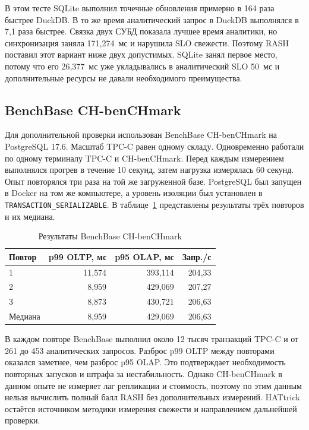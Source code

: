 \documentclass{misisarticle}
\begin{document}
	\newpage
	В этом тесте SQLite выполнил точечные обновления примерно в 164 раза быстрее DuckDB. В то же время аналитический запрос в DuckDB выполнялся в 7{,}1 раза быстрее. Связка двух СУБД показала лучшее время аналитики, но синхронизация заняла 171{,}274~мс и нарушила SLO свежести. Поэтому RASH поставил этот вариант ниже двух допустимых. SQLite занял первое место, потому что его 26{,}377~мс уже укладывались в аналитический SLO 50~мс и дополнительные ресурсы не давали необходимого преимущества.

\subsection{\textnormal{BenchBase CH-benCHmark}}

	Для дополнительной проверки использован BenchBase CH-benCHmark на PostgreSQL 17.6. Масштаб TPC-C равен одному складу. Одновременно работали по одному терминалу TPC-C и CH-benCHmark. Перед каждым измерением выполнялся прогрев в течение 10 секунд, затем нагрузка измерялась 60 секунд. Опыт повторялся три раза на той же загруженной базе. PostgreSQL был запущен в Docker на том же компьютере, а уровень изоляции был установлен в \texttt{TRANSACTION\_SERIALIZABLE}. В таблице~\ref{tab:benchbase-results} представлены результаты трёх повторов и их медиана.

\begin{table}[htbp]
	\caption{Результаты BenchBase CH-benCHmark}
	\label{tab:benchbase-results}
	\centering
	\scriptsize
	\begin{tabular}{@{}lrrr@{}}
		\toprule
		\textbf{Повтор} & \textbf{p99 OLTP, мс} & \textbf{p95 OLAP, мс} & \textbf{Запр./с} \\
		\midrule
		1 & 11{,}574 & 393{,}114 & 204{,}33 \\
		2 & 8{,}959 & 429{,}069 & 207{,}27 \\
		3 & 8{,}873 & 430{,}721 & 206{,}63 \\
		Медиана & 8{,}959 & 429{,}069 & 206{,}63 \\
		\bottomrule
	\end{tabular}
\end{table}

	В каждом повторе BenchBase выполнил около 12 тысяч транзакций TPC-C и от 261 до 453 аналитических запросов. Разброс p99 OLTP между повторами оказался заметнее, чем разброс p95 OLAP. Это подтверждает необходимость повторных запусков и штрафа за нестабильность. Однако CH-benCHmark в данном опыте не измеряет лаг репликации и стоимость, поэтому по этим данным нельзя вычислить полный балл RASH без дополнительных измерений. HATtrick остаётся источником методики измерения свежести и направлением дальнейшей проверки.
\end{document}
